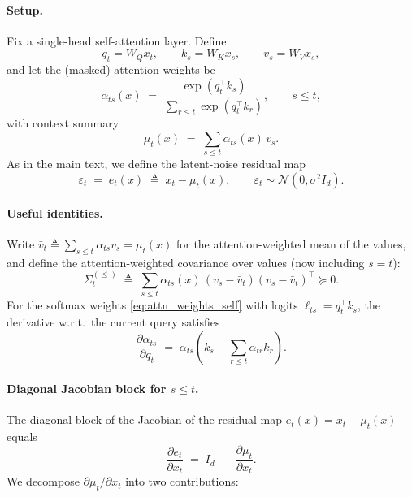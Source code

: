 \documentclass[11pt]{article}
\begin{document}
\paragraph{Setup.}
Fix a single-head self-attention layer. Define
\[
q_t = W_Q x_t, \qquad k_s = W_K x_s, \qquad v_s = W_V x_s,
\]
and let the (masked) attention weights be
\begin{equation}
\alpha_{ts}(x)
\;=\;
\frac{\exp(q_t^\top k_s)}{\sum_{r\le t}\exp(q_t^\top k_r)},
\qquad s\le t,
\label{eq:attn_weights_self}
\end{equation}
with context summary
\begin{equation}
\mu_t(x) \;=\; \sum_{s\le t}\alpha_{ts}(x)\,v_s.
\label{eq:mu_self}
\end{equation}
As in the main text, we define the latent-noise residual map
\begin{equation}
\varepsilon_t \;=\; e_t(x) \;\triangleq\; x_t - \mu_t(x),
\qquad
\varepsilon_t \sim \mathcal{N}(0,\sigma^2 I_d).
\label{eq:residual_self}
\end{equation}

\paragraph{Useful identities.}
Write $\bar v_t \triangleq \sum_{s\le t}\alpha_{ts}v_s = \mu_t(x)$ for the attention-weighted mean of the values, and define the attention-weighted covariance over values (now including $s=t$):
\begin{equation}
\Sigma_t^{(\le)} \;\triangleq\; \sum_{s\le t}\alpha_{ts}(x)\,(v_s-\bar v_t)(v_s-\bar v_t)^\top \succeq 0.
\label{eq:cov_self}
\end{equation}
For the softmax weights \eqref{eq:attn_weights_self} with logits $\ell_{ts}=q_t^\top k_s$, the derivative w.r.t.\ the current query satisfies
\begin{equation}
\frac{\partial \alpha_{ts}}{\partial q_t}
\;=\;
\alpha_{ts}\left(k_s - \sum_{r\le t}\alpha_{tr}k_r\right).
\label{eq:softmax_q_deriv_self}
\end{equation}

\paragraph{Diagonal Jacobian block for $s\le t$.}
The diagonal block of the Jacobian of the residual map $e_t(x)=x_t-\mu_t(x)$ equals
\[
\frac{\partial e_t}{\partial x_t}
\;=\;
I_d \;-\; \frac{\partial \mu_t}{\partial x_t}.
\]
We decompose $\partial\mu_t/\partial x_t$ into two contributions:
\end{document}
